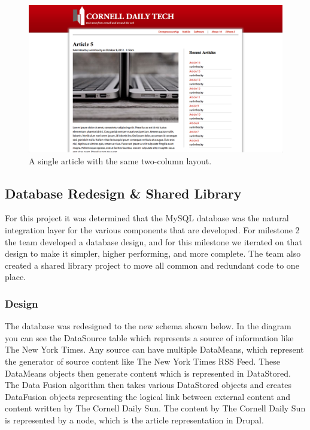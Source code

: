 \documentclass[12pt]{article} %
\begin{document}
\begin{figure}[htbp]
\begin{center}
\includegraphics[width=6in]{images/screenshot3}
\caption{A single article with the same two-column layout.}
\end{center}
\end{figure}

\subsection{Database Redesign \& Shared Library}

For this project it was determined that the MySQL database was the natural integration layer for the various components that are developed. For milestone 2 the team developed a database design, and for this milestone we iterated on that design to make it simpler, higher performing, and more complete. The team also created a shared library project to move all common and redundant code to one place.

\subsubsection{Design}

The database was redesigned to the new schema shown below. In the diagram you can see the DataSource table which represents a source of information like The New York Times. Any source can have multiple DataMeans, which represent the generator of source content like The New York Times RSS Feed. These DataMeans objects then generate content which is represented in DataStored. The Data Fusion algorithm then takes various DataStored objects and creates DataFusion objects representing the logical link between external content and content written by The Cornell Daily Sun. The content by The Cornell Daily Sun is represented by a node, which is the article representation in Drupal.
\end{document}
